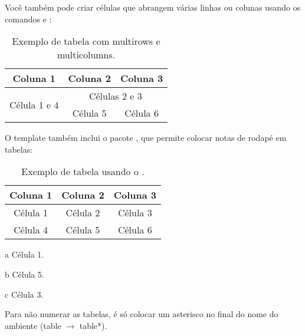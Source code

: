      Você também pode criar células que abrangem várias linhas ou colunas usando os comandos  e :
      \begin{table}[h!]
        \centering
        \caption{Exemplo de tabela com multirows e multicolumns.}
        \label{tab:ex_4}
        \begin{tabular}{@{}ccc@{}}
          \toprule
          \textbf{Coluna 1}             & \textbf{Coluna 2} & \textbf{Coluna 3} \\ \midrule
          \multirow{2}{*}{Célula 1 e 4} & \multicolumn{2}{c}{Células 2 e 3}     \\ 
                                        & Célula 5          & Célula 6          \\ 
          \bottomrule
        \end{tabular}
      \end{table}

      O template também inclui o pacote , que permite colocar notas de rodapé em tabelas:
      \begin{table}[h!]
        \centering
        \caption{Exemplo de tabela usando o .}
        \label{tab:ex_5}
        \begin{threeparttable}
          \begin{tabular}{ccc}
            \toprule
            \textbf{Coluna 1} & \textbf{Coluna 2} & \textbf{Coluna 3} \\ \midrule
            Célula 1\tnote{a} & Célula 2          & Célula 3\tnote{c} \\ 
            Célula 4          & Célula 5\tnote{b} & Célula 6          \\ 
            \bottomrule
          \end{tabular}
          \begin{tablenotes}
            \item[a] Célula 1.
            \item[b] Célula 5.
            \item[c] Célula 3.
          \end{tablenotes}
        \end{threeparttable}
      \end{table}

      Para não numerar as tabelas, é só colocar um asterisco no final do nome do ambiente (table $\rightarrow$ table*).

